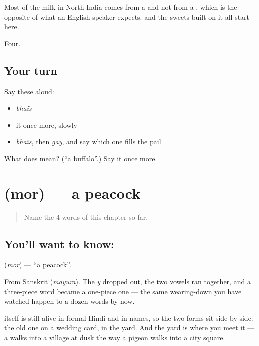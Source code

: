 Most of the milk in North India comes from a  and not from a , which is the opposite of what an English speaker expects.  and the sweets built on it all start here.

\begin{grammarlens}[title={What you've built}]
Four.
\end{grammarlens}

\subsection*{Your turn}
Say these aloud:

\begin{itemize}
\raggedright
  \item \emph{bhaĩs}
  \item it once more, slowly
  \item \emph{bhaĩs}, then \emph{gāy}, and say which one fills the  pail
\end{itemize}

\begin{tcolorbox}[breakable,colback=teal!4,colframe=teal!35!black,title={Before you move on}]
What does  mean? (\textquotedblleft{}a buffalo\textquotedblright{}.) Say it once more.
\end{tcolorbox}
\section[\texorpdfstring{\hi{मोर} (mor)}{मोर (mor)}]{ (mor) — a peacock}

\label{lesson:HI-C60-peacock}



\begin{quote}
Name the 4 words of this chapter so far.
\end{quote}

\subsection*{You'll want to know: }
\textbf{} (\emph{mor}) — \textquotedblleft{}a peacock\textquotedblright{}.

From Sanskrit  (\emph{mayūra}). The \emph{y} dropped out, the two vowels ran together, and a three-piece word became a one-piece one — the same wearing-down you have watched happen to a dozen words by now.

 itself is still alive in formal Hindi and in names, so the two forms sit side by side: the old one on a wedding card,  in the yard. And the yard is where you meet it — a  walks into a village at dusk the way a pigeon walks into a city square.

